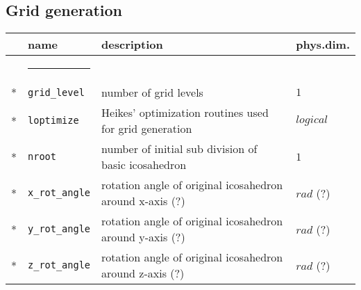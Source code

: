 \subsection{Grid generation}  
\begin{tabular}{l l l l}  
& \parbox{.15\textwidth}{name} & \parbox{.65\textwidth}{description} & 
\parbox{.1\textwidth}{phys.dim.} \\ \hline  
& \rule{4ex}{0pt} & \\[-10pt]  
* & \texttt{grid\_level}  & number of grid levels & $1$ \\
%
* & \texttt{loptimize}  & Heikes' optimization routines used for grid 
generation & $logical$ \\  
* & \texttt{nroot}  & number of initial sub division of basic icosahedron & 
$1$ \\
* & \texttt{x\_rot\_angle}  & rotation angle of original icosahedron around 
x-axis (?) & $rad$ (?) \\
* & \texttt{y\_rot\_angle}  & rotation angle of original icosahedron around 
y-axis (?) & $rad$ (?) \\
* & \texttt{z\_rot\_angle}  & rotation angle of original icosahedron around 
z-axis (?) & $rad$ (?)
\end{tabular}  
